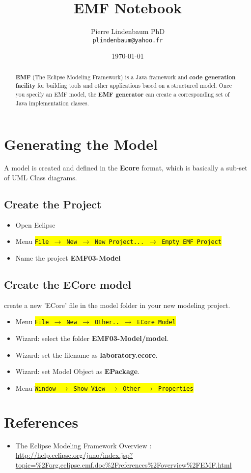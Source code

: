 \documentclass{article}
\date{\today}
\title{EMF Notebook}
\author{Pierre Lindenbaum PhD\\\texttt{plindenbaum@yahoo.fr}}
\newcommand{\menu}[1]{\colorbox{yellow}{\texttt{#1}}}
\def\emf{\textbf{EMF} }
\begin{document}
\maketitle

\begin{abstract}
\emf (The Eclipse Modeling Framework) is a Java framework and \textbf{code generation facility} for building tools and other applications based on a structured model.  Once you specify an EMF model, the \textbf{EMF generator} can create a corresponding set of Java implementation classes. 
\end{abstract}

\section{Generating the Model}
A model is created and defined in the \textbf{Ecore} format, which is basically a sub-set of UML Class diagrams.\\
\subsection{Create the Project}
\begin{itemize}
\item Open Eclipse
\item Menu \menu{File $\rightarrow$  New  $\rightarrow$ New Project... $\rightarrow$ Empty EMF Project}
\item Name the project \textbf{EMF03-Model}
\end{itemize}
\subsection{Create the ECore model}
create a new 'ECore' file in the model folder in your new modeling project.
\begin{itemize}
\item Menu \menu{File $\rightarrow$  New  $\rightarrow$ Other.. $\rightarrow$ ECore Model}
\item Wizard: select the folder \textbf{EMF03-Model/model}.
\item Wizard: set the filename as \textbf{laboratory.ecore}.
\item Wizard: set Model Object as  \textbf{EPackage}.
\item Menu \menu{Window  $\rightarrow$ Show View $\rightarrow$ Other $\rightarrow$ Properties}
\end{itemize}

\section{References}
\begin{itemize}
\item The Eclipse Modeling Framework Overview : \url{http://help.eclipse.org/juno/index.jsp?topic=%2Forg.eclipse.emf.doc%2Freferences%2Foverview%2FEMF.html}
\end{itemize}
\end{document}
